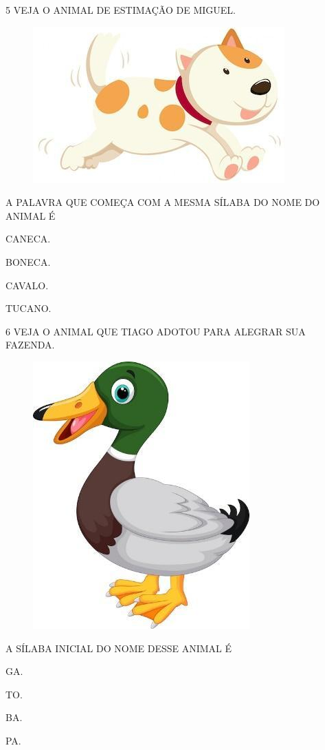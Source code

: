 \num{5} VEJA O ANIMAL DE ESTIMAÇÃO DE MIGUEL.

\begin{figure}[H]
\centering
\includegraphics[width=.55\textwidth]{media/image214.jpg}
\end{figure}

A PALAVRA QUE COMEÇA COM A MESMA SÍLABA DO NOME DO ANIMAL É 

\begin{multicols}{2}
\begin{escolha}[itemsep=0pt]
\item CANECA.

\item BONECA.

\item CAVALO.

\item TUCANO.
\end{escolha}
\end{multicols}

\num{6} VEJA O ANIMAL QUE TIAGO ADOTOU PARA ALEGRAR SUA FAZENDA.

\begin{figure}[htpb]
\centering
\includegraphics[width=.3\textwidth]{media/image215.jpg}
\end{figure}

A SÍLABA INICIAL DO NOME DESSE ANIMAL É

\begin{escolha}
\item GA.

\item TO.

\item BA.

\item PA.
\end{escolha}

